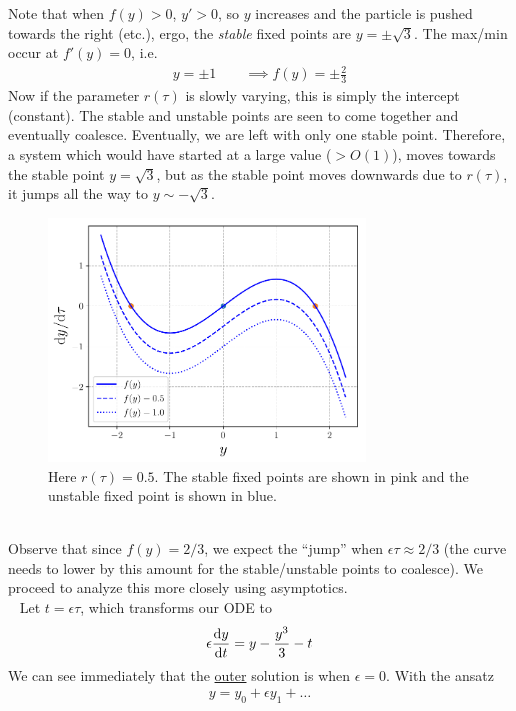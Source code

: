 Note that when $f(y)>0$, $y'>0$, so $y$ increases and the particle is pushed towards the right (etc.), ergo, the \emph{stable} fixed points are $y=\pm \sqrt{3}$. The max/min occur at $f'(y)=0$, i.e.
\begin{gather*}
	y = \pm 1 \qquad \implies f(y) = \pm \frac{2}{3}
\end{gather*}
Now if the parameter $r(\tau)$ is slowly varying, this is simply the intercept (constant). The stable and unstable points are seen to come together and eventually coalesce. Eventually, we are left with only one stable point. Therefore, a system which would have started at a large value ($>O(1)$), moves towards the stable point $y=\sqrt{3}$, but as the stable point moves downwards due to $r(\tau)$, it jumps all the way to $y \sim -\sqrt{3}$.
\begin{figure}[!h]
	\centering
	\includegraphics[width=0.75\textwidth]{./plots/pdf/strogatz-wk21.pdf}
	\caption{Here $r(\tau)=0.5$. The stable fixed points are shown in pink and the unstable fixed point is shown in blue.}
	\label{fig:strogatz-wk21-model}
\end{figure}\\
Observe that since $f(y)=2/3$, we expect the ``jump'' when $\epsilon \tau \approx 2/3$ (the curve needs to lower by this amount for the stable/unstable points to coalesce). We proceed to analyze this more closely using asymptotics. \\
\ \newline
Let $t=\epsilon \tau$, which transforms our ODE to
\begin{gather}
	\epsilon \frac{\mathrm{d} y}{\mathrm{d} t} = y - \frac{y^3}{3} - t \label{eqn:wk21-ode}
\end{gather}
We can see immediately that the \underline{outer} solution is when $\epsilon=0$. With the ansatz
\begin{gather*}
	y = y_0 + \epsilon y_1 + \dots
\end{gather*}
